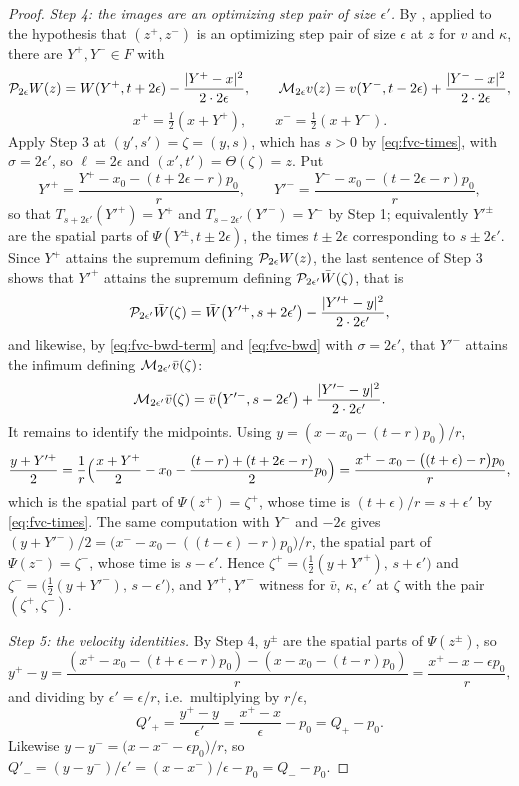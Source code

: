 \begin{proof}
\emph{Step 4: the images are an optimizing step pair of size $\epsilon'$.}
By , applied to the hypothesis that $(z^+,z^-)$ is an
optimizing step pair of size $\epsilon$ at $z$ for $v$ and $\kappa$, there are
$Y^+,Y^-\in F$ with
\[
  \mathcal{P}_{2\epsilon}W(z)=W(Y^+,t+2\epsilon)-\frac{|Y^+-x|^2}{2\cdot2\epsilon},
  \qquad
  \mathcal{M}_{2\epsilon}v(z)=v(Y^-,t-2\epsilon)+\frac{|Y^--x|^2}{2\cdot2\epsilon},
\]
\[
  x^+=\tfrac12(x+Y^+),\qquad x^-=\tfrac12(x+Y^-).
\]
Apply Step 3 at $(y',s')=\zeta=(y,s)$, which has $s>0$ by
\eqref{eq:fvc-times}, with $\sigma=2\epsilon'$, so $\ell=2\epsilon$ and
$(x',t')=\Theta(\zeta)=z$. Put
\[
  Y'^+=\frac{Y^+-x_0-(t+2\epsilon-r)p_0}{r},
  \qquad
  Y'^-=\frac{Y^--x_0-(t-2\epsilon-r)p_0}{r},
\]
so that $T_{s+2\epsilon'}(Y'^+)=Y^+$ and $T_{s-2\epsilon'}(Y'^-)=Y^-$ by
Step 1; equivalently $Y'^\pm$ are the spatial parts of
$\Psi(Y^\pm,t\pm2\epsilon)$, the times $t\pm2\epsilon$ corresponding to
$s\pm2\epsilon'$. Since $Y^+$ attains the supremum defining
$\mathcal{P}_{2\epsilon}W(z)$, the last sentence of Step 3 shows that $Y'^+$ attains
the supremum defining $\mathcal{P}_{2\epsilon'}\bar W(\zeta)$, that is
\[
  \mathcal{P}_{2\epsilon'}\bar W(\zeta)
   =\bar W\bigl(Y'^+,s+2\epsilon'\bigr)
     -\frac{|Y'^+-y|^2}{2\cdot2\epsilon'} ,
\]
and likewise, by \eqref{eq:fvc-bwd-term} and \eqref{eq:fvc-bwd} with
$\sigma=2\epsilon'$, that $Y'^-$ attains the infimum defining
$\mathcal{M}_{2\epsilon'}\bar v(\zeta)$:
\[
  \mathcal{M}_{2\epsilon'}\bar v(\zeta)
   =\bar v\bigl(Y'^-,s-2\epsilon'\bigr)
     +\frac{|Y'^--y|^2}{2\cdot2\epsilon'} .
\]
It remains to identify the midpoints. Using
$y=(x-x_0-(t-r)p_0)/r$,
\[
  \frac{y+Y'^+}{2}
   =\frac{1}{r}\Bigl(\frac{x+Y^+}{2}-x_0
       -\frac{(t-r)+(t+2\epsilon-r)}{2}p_0\Bigr)
   =\frac{x^+-x_0-\bigl((t+\epsilon)-r\bigr)p_0}{r},
\]
which is the spatial part of $\Psi(z^+)=\zeta^+$, whose time is
$(t+\epsilon)/r=s+\epsilon'$ by \eqref{eq:fvc-times}. The same computation with
$Y^-$ and $-2\epsilon$ gives
$(y+Y'^-)/2=\bigl(x^--x_0-((t-\epsilon)-r)p_0\bigr)/r$, the spatial part of
$\Psi(z^-)=\zeta^-$, whose time is $s-\epsilon'$. Hence
$\zeta^+=\bigl(\tfrac12(y+Y'^+),\,s+\epsilon'\bigr)$ and
$\zeta^-=\bigl(\tfrac12(y+Y'^-),\,s-\epsilon'\bigr)$, and $Y'^+,Y'^-$ witness
 for $\bar v$, $\kappa$, $\epsilon'$ at $\zeta$ with the
pair $(\zeta^+,\zeta^-)$.

\emph{Step 5: the velocity identities.}
By Step 4, $y^\pm$ are the spatial parts of $\Psi(z^\pm)$, so
\[
  y^+-y=\frac{(x^+-x_0-(t+\epsilon-r)p_0)-(x-x_0-(t-r)p_0)}{r}
       =\frac{x^+-x-\epsilon p_0}{r},
\]
and dividing by $\epsilon'=\epsilon/r$, i.e.\ multiplying by $r/\epsilon$,
\[
  Q'_+=\frac{y^+-y}{\epsilon'}=\frac{x^+-x}{\epsilon}-p_0=Q_+-p_0 .
\]
Likewise $y-y^-=\bigl(x-x^--\epsilon p_0\bigr)/r$, so
$Q'_-=(y-y^-)/\epsilon'=(x-x^-)/\epsilon-p_0=Q_--p_0$.


\end{proof}
